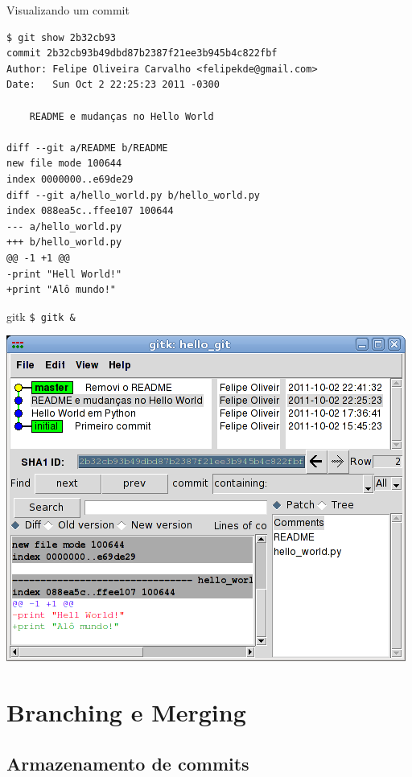 \documentclass[portuguese,brazil]{beamer}
\newcommand\sectiontoc{
  \begin{frame}
    \tableofcontents[currentsection]
  \end{frame}
}
\begin{document}
\begin{frame}[fragile]{Visualizando um commit}
\begin{verbatim}
$ git show 2b32cb93
commit 2b32cb93b49dbd87b2387f21ee3b945b4c822fbf
Author: Felipe Oliveira Carvalho <felipekde@gmail.com>
Date:   Sun Oct 2 22:25:23 2011 -0300

    README e mudanças no Hello World

diff --git a/README b/README
new file mode 100644
index 0000000..e69de29
diff --git a/hello_world.py b/hello_world.py
index 088ea5c..ffee107 100644
--- a/hello_world.py
+++ b/hello_world.py
@@ -1 +1 @@
-print "Hell World!"
+print "Alô mundo!"
\end{verbatim}
\end{frame}

\begin{frame}{gitk}
\texttt{\$ gitk \&}
\begin{center}
  \includegraphics[scale=0.45]{images/gitkhellogit.png}
\end{center}
\end{frame}

\section{Branching e Merging}

\sectiontoc

\subsection{Armazenamento de commits}
\end{document}
